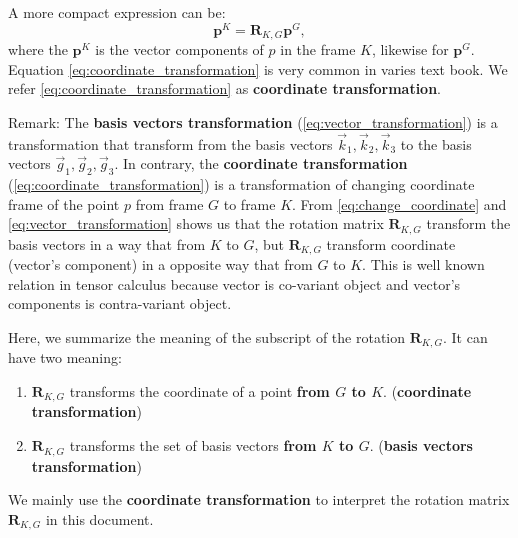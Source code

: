 \documentclass{article}
\newcommand{\mat}[1]{\mathbf{#1}}
\newcommand{\MR}{\mat{R}}
\begin{document}
A more compact expression can be: 
\begin{equation}
\mathbf{p}^K = \MR_{K,G} \mathbf{p}^G
    \label{eq:coordinate_transformation},
\end{equation}
where the $\mathbf{p}^K$ is the vector components of $p$ in the frame $K$, likewise for $\mathbf{p}^G$. Equation \ref{eq:coordinate_transformation} is very common in varies text book. We refer \cref{eq:coordinate_transformation} as \textbf{coordinate transformation}.

Remark: The \textbf{basis vectors transformation} (\cref{eq:vector_transformation}) is a transformation that transform from the basis vectors  $\vec{k}_1, \vec{k}_2, \vec{k}_3$ to the basis vectors $\vec{g}_1, \vec{g}_2, \vec{g}_3$. In contrary, the \textbf{coordinate transformation} (\cref{eq:coordinate_transformation}) is a transformation of changing coordinate frame of the point $p$ from frame $G$ to frame $K$. From \cref{eq:change_coordinate} and \cref{eq:vector_transformation} shows us that the rotation matrix $\MR_{K,G}$ transform the basis vectors in a way that from $K$ to $G$, but $\MR_{K,G}$ transform coordinate (vector's component) in a opposite way that from $G$ to $K$. This is well known relation in tensor calculus because vector is co-variant object and vector's components is contra-variant object.

Here, we summarize the meaning of the subscript of the rotation $\MR_{K,G}$. It can have two meaning:
\begin{tcolorbox}
\begin{enumerate}
    \item $\MR_{K,G}$ transforms the coordinate of a point \textbf{from $G$ to $K$}. (\textbf{coordinate transformation})
    \item $\MR_{K,G}$ transforms the set of basis vectors \textbf{from $K$ to $G$}. (\textbf{basis vectors transformation})
\end{enumerate}
\end{tcolorbox}
We mainly use the \textbf{coordinate transformation} to interpret the rotation matrix $\MR_{K,G}$ in this document.

%
%
\end{document}
